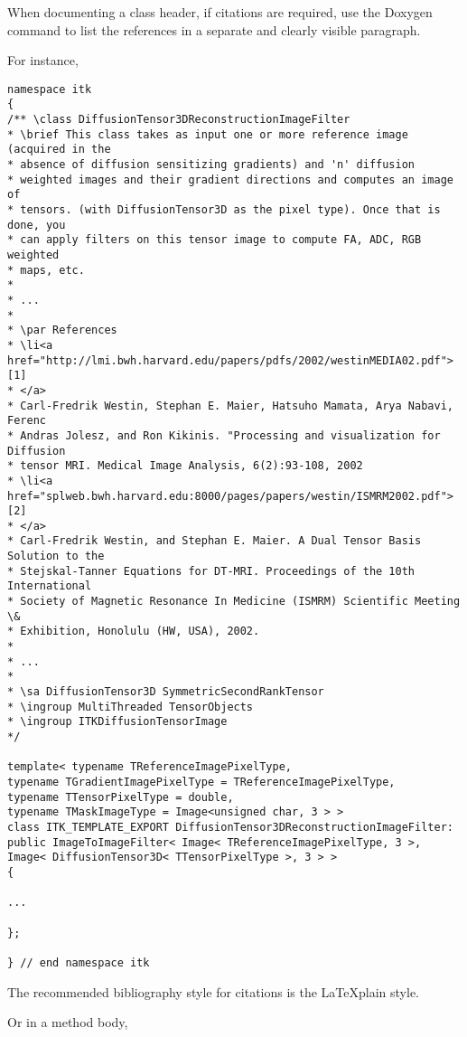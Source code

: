 When documenting a class header, if citations are required, use the Doxygen
 command to list the references in a separate and clearly
visible paragraph.

For instance,

\small
\begin{verbatim}
namespace itk
{
/** \class DiffusionTensor3DReconstructionImageFilter
* \brief This class takes as input one or more reference image (acquired in the
* absence of diffusion sensitizing gradients) and 'n' diffusion
* weighted images and their gradient directions and computes an image of
* tensors. (with DiffusionTensor3D as the pixel type). Once that is done, you
* can apply filters on this tensor image to compute FA, ADC, RGB weighted
* maps, etc.
*
* ...
*
* \par References
* \li<a href="http://lmi.bwh.harvard.edu/papers/pdfs/2002/westinMEDIA02.pdf">[1]
* </a>
* Carl-Fredrik Westin, Stephan E. Maier, Hatsuho Mamata, Arya Nabavi, Ferenc
* Andras Jolesz, and Ron Kikinis. "Processing and visualization for Diffusion
* tensor MRI. Medical Image Analysis, 6(2):93-108, 2002
* \li<a href="splweb.bwh.harvard.edu:8000/pages/papers/westin/ISMRM2002.pdf">[2]
* </a>
* Carl-Fredrik Westin, and Stephan E. Maier. A Dual Tensor Basis Solution to the
* Stejskal-Tanner Equations for DT-MRI. Proceedings of the 10th International
* Society of Magnetic Resonance In Medicine (ISMRM) Scientific Meeting \&
* Exhibition, Honolulu (HW, USA), 2002.
*
* ...
*
* \sa DiffusionTensor3D SymmetricSecondRankTensor
* \ingroup MultiThreaded TensorObjects
* \ingroup ITKDiffusionTensorImage
*/

template< typename TReferenceImagePixelType,
typename TGradientImagePixelType = TReferenceImagePixelType,
typename TTensorPixelType = double,
typename TMaskImageType = Image<unsigned char, 3 > >
class ITK_TEMPLATE_EXPORT DiffusionTensor3DReconstructionImageFilter:
public ImageToImageFilter< Image< TReferenceImagePixelType, 3 >,
Image< DiffusionTensor3D< TTensorPixelType >, 3 > >
{

...

};

} // end namespace itk
\end{verbatim}
\normalsize

The recommended bibliography style for citations is the \LaTeX plain style.

Or in a method body,

